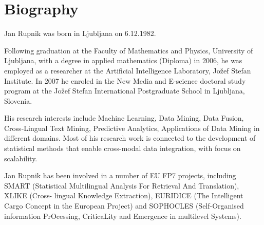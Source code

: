%
\chapter{Biography}

Jan Rupnik was born in Ljubljana on 6.12.1982. 
 
Following graduation at the Faculty of Mathematics and Physics, University of Ljubljana, 
with a degree in applied mathematics (Diploma) in 2006, he was employed as a researcher 
at the Artificial Intelligence Laboratory, Jožef Stefan Institute. In 2007 he
enroled in the New Media and E-science doctoral study program at the Jožef Stefan 
International Postgraduate School in Ljubljana, Slovenia.

His research interests include Machine Learning, Data Mining, Data
Fusion, Cross-Lingual Text Mining, Predictive Analytics, Applications of Data Mining
in different domains. Most of his research work is connected to the development of
statistical methods that enable cross-modal data integration, with focus on
scalability. 

Jan Rupnik has been involved in a number of EU FP7 projects, including
SMART (Statistical Multilingual Analysis For Retrieval And Translation), XLIKE (Cross-
lingual Knowledge Extraction), EURIDICE (The Intelligent Cargo Concept in the
European Project) and SOPHOCLES (Self-Organised information PrOcessing,
CriticaLity and Emergence in multilevel Systems).